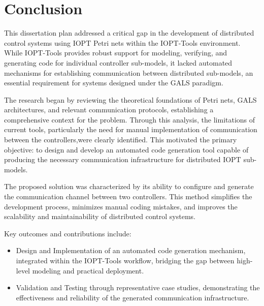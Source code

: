 
%

\makeatletter
\newcommand{\ntifpkgloaded}{%
  \@ifpackageloaded%
}
\makeatother


\chapter{Conclusion}
\label{cha:conclusion}

This dissertation plan addressed a critical gap in the development of distributed control systems using IOPT Petri nets within the IOPT-Tools environment. While IOPT-Tools provides robust support for modeling, verifying, and generating code for individual controller sub-models, it lacked automated mechanisms for establishing communication between distributed sub-models, an essential requirement for systems designed under the GALS paradigm.

The research began by reviewing the theoretical foundations of Petri nets, GALS architectures, and relevant communication protocols, establishing a comprehensive context for the problem. Through this analysis, the limitations of current tools, particularly the need for manual implementation of communication between the controllers,were clearly identified. This motivated the primary objective: to design and develop an automated code generation tool capable of producing the necessary communication infrastructure for distributed IOPT sub-models.

The proposed solution was characterized by its ability to configure and generate the communication channel between two controllers. This method simplifies the development process, minimizes manual coding mistakes, and improves the scalability and maintainability of distributed control systems.

Key outcomes and contributions include:
\begin{itemize}
    \item Design and Implementation of an automated code generation mechanism, integrated within the IOPT-Tools workflow, bridging the gap between high-level modeling and practical deployment.

    \item Validation and Testing through representative case studies, demonstrating the effectiveness and reliability of the generated communication infrastructure.
\end{itemize}


